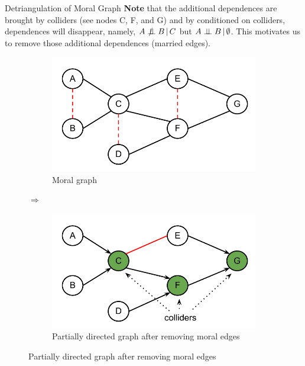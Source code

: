 \begin{frame}{Detriangulation of Moral Graph}
\textbf{Note} that the additional dependences are brought by colliders (see nodes C, F, and G) and by conditioned on colliders, dependences will disappear, namely, $A\dep B \, | \, C$ but $A\perp\!\!\!\perp B \,|\, \emptyset$. This motivates us to remove those additional dependences (married edges).\pause
\begin{figure}
\setcounter{subfigure}{0}
\begin{subfigure}[H]{0.4\textwidth}
\includegraphics[scale=0.4]{imgs/BNs7nMoral}
\caption{Moral graph}
\end{subfigure}\hfill $\Rightarrow$ \hfill
\begin{subfigure}[H]{0.4\textwidth}
\includegraphics[scale=0.4]{imgs/BNs7nDet}
\caption{Partially directed graph after removing moral edges}
\end{subfigure}
\end{figure}
\end{frame}
